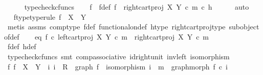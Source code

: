 \begin{isabellebody}
\ \ \ \ \isamarkupfalse%
\ typecheck{\isacharunderscore}{\kern0pt}cfuncs\isanewline
\ \ \isamarkupfalse%
\ f\ \ f{\isacharunderscore}{\kern0pt}def{\isacharcolon}{\kern0pt}\ {\isachardoublequoteopen}f\ {\isacharequal}{\kern0pt}\ {\isacharparenleft}{\kern0pt}right{\isacharunderscore}{\kern0pt}cart{\isacharunderscore}{\kern0pt}proj\ X\ Y{\isacharparenright}{\kern0pt}\ {\isasymcirc}\isactrlsub c\ m\ {\isasymcirc}\isactrlsub c\ h{\isachardoublequoteclose}\isanewline
\ \ \ \ \isamarkupfalse%
\ auto\isanewline
\ \ \isamarkupfalse%
\ \isamarkupfalse%
\ f{\isacharunderscore}{\kern0pt}type{\isacharbrackleft}{\kern0pt}type{\isacharunderscore}{\kern0pt}rule{\isacharbrackright}{\kern0pt}{\isacharcolon}{\kern0pt}\ {\isachardoublequoteopen}f\ {\isacharcolon}{\kern0pt}\ X\ {\isasymrightarrow}\ Y{\isachardoublequoteclose}\isanewline
\ \ \ \ \isamarkupfalse%
\ {\isacharparenleft}{\kern0pt}metis\ assms\ comp{\isacharunderscore}{\kern0pt}type\ f{\isacharunderscore}{\kern0pt}def\ functional{\isacharunderscore}{\kern0pt}on{\isacharunderscore}{\kern0pt}def\ h{\isacharunderscore}{\kern0pt}type\ right{\isacharunderscore}{\kern0pt}cart{\isacharunderscore}{\kern0pt}proj{\isacharunderscore}{\kern0pt}type\ subobject{\isacharunderscore}{\kern0pt}of{\isacharunderscore}{\kern0pt}def{}{\isacharparenright}{\kern0pt}\isanewline
\isanewline
\ \ \isamarkupfalse%
\ eq{\isacharcolon}{\kern0pt}\ {\isachardoublequoteopen}f\ {\isasymcirc}\isactrlsub c\ left{\isacharunderscore}{\kern0pt}cart{\isacharunderscore}{\kern0pt}proj\ X\ Y\ {\isasymcirc}\isactrlsub c\ m\ {\isacharequal}{\kern0pt}\ right{\isacharunderscore}{\kern0pt}cart{\isacharunderscore}{\kern0pt}proj\ X\ Y\ {\isasymcirc}\isactrlsub c\ m{\isachardoublequoteclose}\isanewline
\ \ \ \ \isamarkupfalse%
\ f{\isacharunderscore}{\kern0pt}def\ h{\isacharunderscore}{\kern0pt}def\ \isamarkupfalse%
\ {\isacharparenleft}{\kern0pt}typecheck{\isacharunderscore}{\kern0pt}cfuncs{\isacharcomma}{\kern0pt}\ smt\ comp{\isacharunderscore}{\kern0pt}associative{}\ id{\isacharunderscore}{\kern0pt}right{\isacharunderscore}{\kern0pt}unit{}\ inv{\isacharunderscore}{\kern0pt}left\ isomorphism{\isacharparenright}{\kern0pt}\isanewline
\isanewline
\ \ \isamarkupfalse%
\ {\isachardoublequoteopen}{\isasymexists}f{\isachardot}{\kern0pt}\ f\ {\isacharcolon}{\kern0pt}\ X\ {\isasymrightarrow}\ Y\ {\isasymand}\ {\isacharparenleft}{\kern0pt}{\isasymexists}i{\isachardot}{\kern0pt}\ i\ {\isacharcolon}{\kern0pt}\ R\ {\isasymrightarrow}\ graph\ f\ {\isasymand}\ isomorphism\ i\ {\isasymand}\ m\ {\isacharequal}{\kern0pt}\ graph{\isacharunderscore}{\kern0pt}morph\ f\ {\isasymcirc}\isactrlsub c\ i{\isacharparenright}{\kern0pt}{\isachardoublequoteclose}\isanewline

\end{isabellebody}
